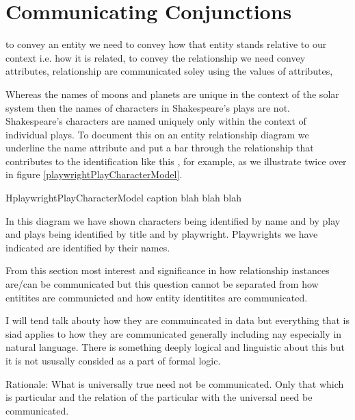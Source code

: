 \section{Communicating Conjunctions}
\label{CommunicatingConjunctions}

\begin{oldtt}
\mynote to convey an entity we need to convey how that entity stands relative to our context i.e. how it is related,
to convey the relationship we need convey attributes,
 relationship are communicated soley using the values of attributes,

\mynote
Whereas the names of moons and planets are unique in the context of the solar system then the names of characters in Shakespeare's plays are not. Shakespeare's characters are named uniquely only within the context of individual plays. To document this on an entity relationship diagram we underline the name attribute and put a bar through the relationship that contributes to the identification like this \barkerEllisJ, for example, as we illustrate twice over in figure \ref{playwrightPlayCharacterModel}.


\begin{erboxedFigure} {H}{playwrightPlayCharacterModel}
{
caption blah blah blah
 }

\end{erboxedFigure}

In this diagram we have shown characters being identified by name and by play 
and plays being identified by title and by playwright. Playwrights we have indicated are identified by their names.



\mynote 
From this section most interest and significance  in how relationship instances are/can be communicated but this question cannot be separated from how entitites are communicted and how entity identitites are communicated.

\mynote I will tend talk abouty how they are commuincated in data but everything that is siad applies to how they are communicated generally including nay especially in natural language. There is something deeply logical and linguistic about this but it is not ususally consided as a part of formal logic.

\mynote Rationale: What is universally true need not be communicated. Only that which is particular and the relation of the particular with the universal need be communicated. 


\end{oldtt}
